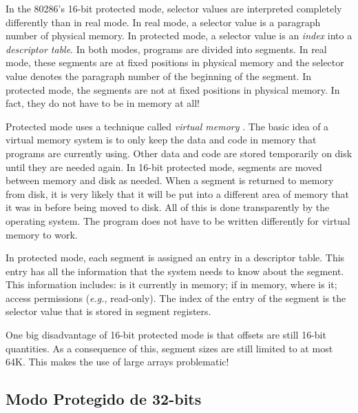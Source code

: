 In the 80286's 16-bit protected mode, selector values are interpreted
completely differently than in real mode. In real mode, a selector
value is a paragraph number of physical memory. In protected mode, a
selector value is an \emph{index} into a \emph{descriptor table}. In
both modes, programs are divided into
segments. In real mode, these segments are at
fixed positions in physical memory and the selector value denotes the
paragraph number of the beginning of the segment. In protected mode,
the segments are not at fixed positions in physical memory. In fact,
they do not have to be in memory at all!

Protected mode uses a technique called \emph{virtual memory}
. The basic idea of a virtual memory system is
to only keep the data and code in memory that programs are currently
using. Other data and code are stored temporarily on disk until they
are needed again.  In 16-bit protected mode, segments are moved
between memory and disk as needed. When a segment is returned to
memory from disk, it is very likely that it will be put into a
different area of memory that it was in before being moved to
disk. All of this is done transparently by the operating system. The
program does not have to be written differently for virtual memory to
work.

In protected mode, each segment is assigned an entry in a descriptor table.
This entry has all the information that the system needs to know about the
segment. This information includes: is it currently in memory; if in memory,
where is it; access permissions ({\em e.g.\/}, read-only). The index of the
entry of the segment is the selector value that is stored in segment registers.

One  big disadvantage of 16-bit protected mode is that offsets
are still 16-bit quantities. As a consequence of this, segment sizes
are still limited to at most 64K. This makes the use of large arrays
problematic!

\subsection{Modo Protegido de 32-bits}

